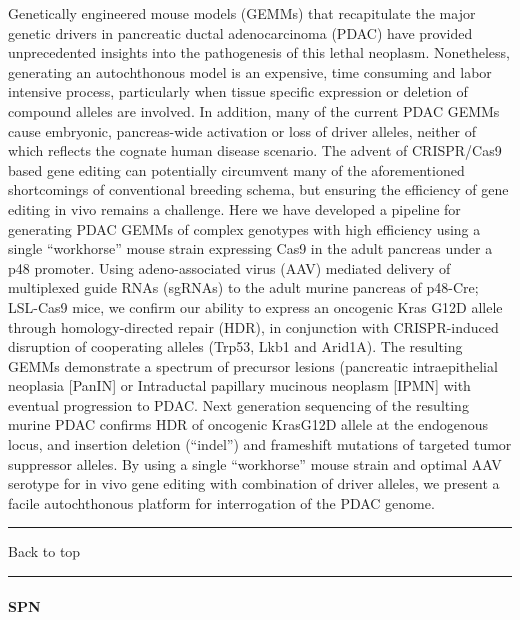 \documentclass[]{article}
\let\oldparagraph\paragraph
\renewcommand{\paragraph}[1]{\oldparagraph{#1}\mbox{}}
\begin{document}
Genetically engineered mouse models (GEMMs) that recapitulate the major
genetic drivers in pancreatic ductal adenocarcinoma (PDAC) have provided
unprecedented insights into the pathogenesis of this lethal neoplasm.
Nonetheless, generating an autochthonous model is an expensive, time
consuming and labor intensive process, particularly when tissue specific
expression or deletion of compound alleles are involved. In addition,
many of the current PDAC GEMMs cause embryonic, pancreas-wide activation
or loss of driver alleles, neither of which reflects the cognate human
disease scenario. The advent of CRISPR/Cas9 based gene editing can
potentially circumvent many of the aforementioned shortcomings of
conventional breeding schema, but ensuring the efficiency of gene
editing in vivo remains a challenge. Here we have developed a pipeline
for generating PDAC GEMMs of complex genotypes with high efficiency
using a single ``workhorse'' mouse strain expressing Cas9 in the adult
pancreas under a p48 promoter. Using adeno-associated virus (AAV)
mediated delivery of multiplexed guide RNAs (sgRNAs) to the adult murine
pancreas of p48-Cre; LSL-Cas9 mice, we confirm our ability to express an
oncogenic Kras G12D allele through homology-directed repair (HDR), in
conjunction with CRISPR-induced disruption of cooperating alleles
(Trp53, Lkb1 and Arid1A). The resulting GEMMs demonstrate a spectrum of
precursor lesions (pancreatic intraepithelial neoplasia {[}PanIN{]} or
Intraductal papillary mucinous neoplasm {[}IPMN{]} with eventual
progression to PDAC. Next generation sequencing of the resulting murine
PDAC confirms HDR of oncogenic KrasG12D allele at the endogenous locus,
and insertion deletion (``indel'') and frameshift mutations of targeted
tumor suppressor alleles. By using a single ``workhorse'' mouse strain
and optimal AAV serotype for in vivo gene editing with combination of
driver alleles, we present a facile autochthonous platform for
interrogation of the PDAC genome.

{}

{}

\begin{center}\rule{0.5\linewidth}{\linethickness}\end{center}

Back to top

\begin{center}\rule{0.5\linewidth}{\linethickness}\end{center}

\pagebreak

\hypertarget{spn}{%
\paragraph{SPN}\label{spn}}
\end{document}
